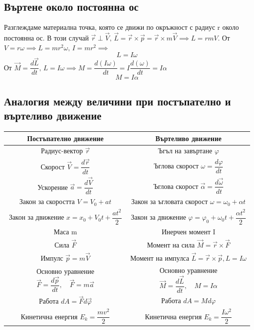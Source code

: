 \documentclass[fleqn, 12pt]{article}
\theoremstyle{definition}
\begin{document}
\subsection{Въртене около постоянна ос}
Разглеждаме материална точка, която се движи по окръжност с радиус r около постоянна ос. В този случай  $\vec{r} \perp \vec{V}, \, \vec{L} = \vec{r} \times \vec{p} = \vec{r} \times m\vec{V} \implies L = rmV $. От $V = r \omega \implies L =mr^2  \omega, \, I = mr^2 \implies $ 
$$L = I\omega$$
От $\vec{M} = \dfrac{d \vec{L}}{dt},\, L = I\omega \implies  M = \dfrac{d(I\omega)}{dt} = I \dfrac{d(\omega)}{dt} = I\alpha$
$$M = I\alpha $$

\subsection{Аналогия между величини при постъпателно и въртеливо движение}

\begin{center}
\begin{tabular}{ |c|c| } 
 \hline
 \textbf{Постъпателно движение} & \textbf{Въртеливо движение} \\ 
\hline
Радиус-вектор $\vec{r} $ & Ъгъл на завъртане $\varphi$ \\ 
\hline
 Скорост $\vec{V} = \dfrac{d \vec{r}}{dt}$ & Ъглова скорост  $\omega = \dfrac{d\varphi}{dt}$\\ 
 \hline
 Ускорение $\vec{a} = \dfrac{d \vec{V}}{dt}$ & Ъглова скорост  $\vec{\alpha} = \dfrac{d\vec{\omega}}{dt}$\\ 
 \hline
 Закон за скоростта $V = V_0 + at$ & Закон за ъгловата скорост $\omega = \omega_0 + \alpha t$ \\
\hline
Закон за движение $x = x_0 + V_0t + \dfrac{at^2}{2}$ & Закон за движение  $\varphi = \varphi_0 + \omega_0t + \dfrac{\alpha t^2}{2}$  \\
\hline
Маса m & Инерчен момент I\\
\hline
Сила $\vec{F}$ & Момент на сила $\vec{M} = \vec{r} \times \vec{F} $ \\
\hline
Импулс $\vec{p} = m\vec{V}$ & Момент на импулса $\vec{L} = \vec{r} \times \vec{p}, L = I\omega $\\
\hline
Основно уравнение $ \vec{F} = \dfrac{d \vec{p}}{dt}, \quad  \vec{F} = m\vec{a} $ & Основно уравнение $\vec{M} = \dfrac{d \vec{L}}{dt}, \quad  M = I\alpha$ \\
\hline
Работа $dA = \vec{F} d\vec{\varphi}$ & Работа $dA = Md\varphi$ \\
\hline
Кинетична енергия $E_k = \dfrac{mv^2}{2}$ &  Кинетична енергия $E_k = \dfrac{I \omega^2}{2}$\\
\hline
\end{tabular}
\end{center}
\end{document}
